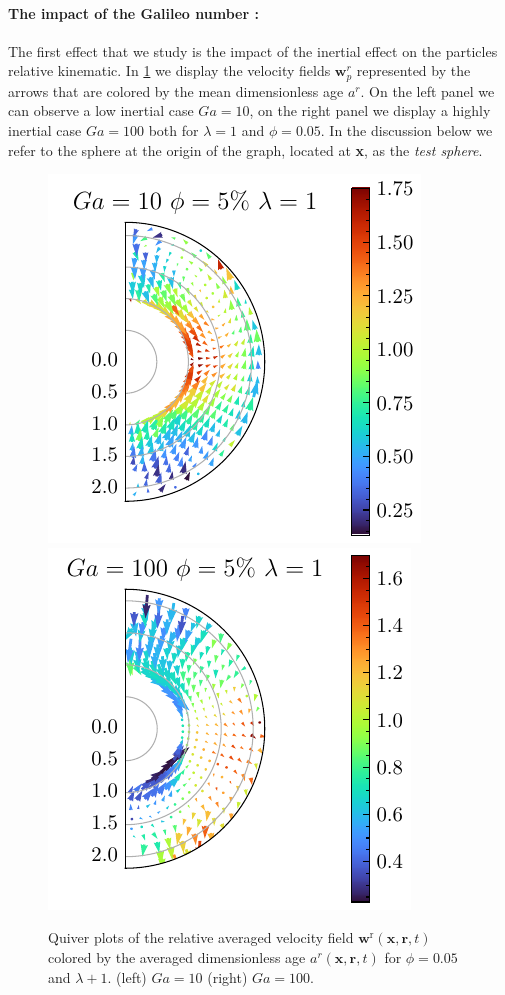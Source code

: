 \paragraph*{The impact of the Galileo number : }
The first effect that we study is the impact of the inertial effect on the particles relative kinematic.  
In \ref{fig:Why_Ga_matter} we display the velocity fields $\textbf{w}_p^r$ represented by the arrows that are colored by the mean dimensionless age $a^r$.  
On the left panel we can observe a low inertial case $Ga = 10$, on the right panel we display a highly inertial case $Ga=100$ both for $\lambda =1$ and $\phi=0.05$.
In the discussion below we refer to the sphere at the origin of the graph, located at \textbf{x}, as the \textit{test sphere}. 
\begin{figure}[h!]
    \centering
    \includegraphics[height=0.35\textwidth]{image/HOMOGENEOUS_NEW/Dist/U_rel_l_1_Ga_10_PHI_5.pdf}
    \includegraphics[height=0.35\textwidth]{image/HOMOGENEOUS_NEW/Dist/U_rel_l_1_Ga_100_PHI_5.pdf}
    \caption{
         Quiver plots of the relative averaged velocity field $\textbf{w}^\text{r}(\textbf{x},\textbf{r},t)$ colored by the averaged dimensionless age $a^r(\textbf{x},\textbf{r},t)$ for $\phi = 0.05$ and $\lambda +1$.
         (left) $Ga = 10$ (right) $Ga =100$. }
    \label{fig:Why_Ga_matter}
\end{figure}

